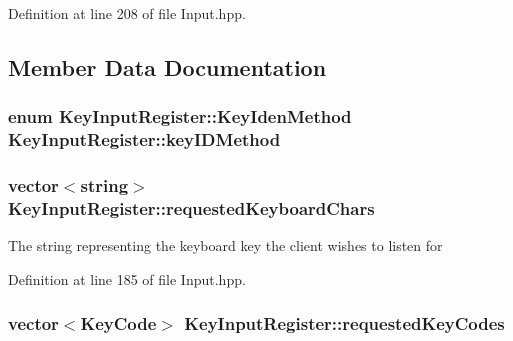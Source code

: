 Definition at line 208 of file Input.\-hpp.



\subsection{Member Data Documentation}
\hypertarget{class_key_input_register_adf60b0b21fcd0b52bf3c505528519b47}{
\subsubsection[{key\-I\-D\-Method}]{\setlength{\rightskip}{0pt plus 5cm}enum {\bf Key\-Input\-Register\-::\-Key\-Iden\-Method}  Key\-Input\-Register\-::key\-I\-D\-Method\hspace{0.3cm}{\ttfamily [protected]}}}\label{class_key_input_register_adf60b0b21fcd0b52bf3c505528519b47}
\hypertarget{class_key_input_register_a6ff79253202f3106320ed21e9f3eb803}{
\subsubsection[{requested\-Keyboard\-Chars}]{\setlength{\rightskip}{0pt plus 5cm}vector$<$string$>$ Key\-Input\-Register\-::requested\-Keyboard\-Chars\hspace{0.3cm}{\ttfamily [protected]}}}\label{class_key_input_register_a6ff79253202f3106320ed21e9f3eb803}
The string representing the keyboard key the client wishes to listen for 

Definition at line 185 of file Input.\-hpp.

\hypertarget{class_key_input_register_a15cc8379e648634a63e1bedd645d03c3}{
\subsubsection[{requested\-Key\-Codes}]{\setlength{\rightskip}{0pt plus 5cm}vector$<${\bf Key\-Code}$>$ Key\-Input\-Register\-::requested\-Key\-Codes\hspace{0.3cm}{\ttfamily [protected]}}}\label{class_key_input_register_a15cc8379e648634a63e1bedd645d03c3}


